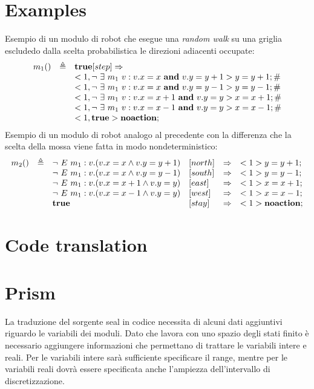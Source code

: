 \section{Examples}
Esempio di un modulo di robot che esegue una \emph{random walk} su una griglia escludedo dalla scelta probabilistica le direzioni adiacenti occupate:
$$
\begin{array}{rcl}
m_1 () & \triangleq & \mathbf{true} [step]\Rightarrow \\ 
	& & <1, \neg \mbox{ } \exists \mbox{ } m_1 \mbox{ } v: v.x=x \mbox{ } \mathbf{and} \mbox{ } v.y=y+1> y=y+1; \# \\
	& & <1, \neg \mbox{ } \exists \mbox{ } m_1 \mbox{ } v: v.x=x \mbox{ } \mathbf{and} \mbox{ } v.y=y-1> y=y-1; \# \\ 
	& & <1, \neg \mbox{ } \exists \mbox{ } m_1 \mbox{ } v: v.x=x+1 \mbox{ } \mathbf{and} \mbox{ } v.y=y> x=x+1; \# \\ 
	& & <1, \neg \mbox{ } \exists \mbox{ } m_1 \mbox{ } v: v.x=x-1 \mbox{ } \mathbf{and} \mbox{ } v.y=y> x=x-1; \# \\ 
	& & <1, \mathbf{true}> \mathbf{noaction};\\ 
\end{array}
$$
Esempio di un modulo di robot analogo al precedente con la differenza che la scelta della mossa viene fatta in modo nondeterministico:
$$
\begin{array}{rcllcl}
m_2 () & \triangleq & \neg \mbox{ } E \mbox{ } m_1 : v . (v.x=x \wedge v.y=y+1) &[north]&\Rightarrow& <1> y=y+1; \\ 
	& & \neg \mbox{ } E \mbox{ } m_1 : v . (v.x=x \wedge v.y=y-1) &[south]&\Rightarrow& <1> y=y-1; \\ 
	& & \neg \mbox{ } E \mbox{ } m_1 : v . (v.x=x+1 \wedge v.y=y) &[east]&\Rightarrow& <1> x=x+1; \\ 
	& & \neg \mbox{ } E \mbox{ } m_1 : v . (v.x=x-1 \wedge v.y=y) &[west]&\Rightarrow& <1> x=x-1; \\ 
	& & \mathbf{true} &[stay]&\Rightarrow& <1> \mathbf{noaction}; \\ 
\end{array}
$$

\section{Code translation}
\section{Prism}
La traduzione del sorgente \ac{seal} in codice \prism{} necessita di alcuni dati aggiuntivi riguardo le variabili dei moduli. Dato che \prism{} lavora con uno spazio degli stati finito è necessario aggiungere informazioni che permettano di trattare le variabili intere e reali. Per le variabili intere sarà sufficiente specificare il range, mentre per le variabili reali dovrà essere specificata anche l'ampiezza dell'intervallo di discretizzazione.

